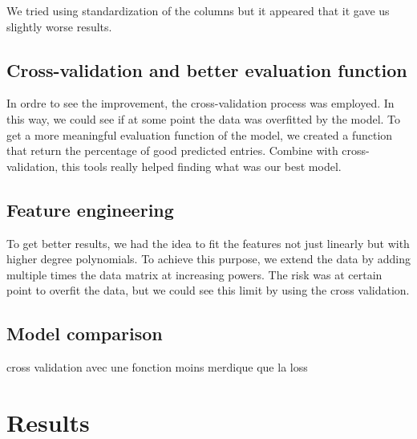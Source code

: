 \documentclass[10pt,conference,compsocconf]{IEEEtran}
\begin{document}
We tried using standardization of the columns but it appeared that it gave us slightly worse results.

\subsection{Cross-validation and better evaluation function}
In ordre to see the improvement, the cross-validation process was employed. In this way, we could see if at some point the data was overfitted by the model. To get a more meaningful evaluation function of the model, we created a function that return the percentage of good predicted entries. Combine with cross-validation, this tools really helped finding what was our best model.

\subsection{Feature engineering}
To get better results, we had the idea to fit the features not just linearly but with higher degree polynomials. To achieve this purpose, we extend the data by adding multiple times the data matrix at increasing powers. The risk was at certain point to overfit the data, but we could see this limit by using the cross validation. 

\subsection{Model comparison}
cross validation avec une fonction moins merdique que la loss




\section{Results}
\end{document}
